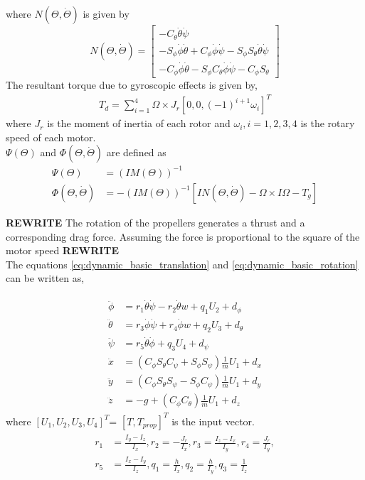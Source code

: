 \documentclass{article}
\begin{document}
where $N(\Theta,\dot{\Theta})$ is given by
\begin{equation*}
N(\Theta,\dot{\Theta})=
\left[\begin{array}{c}
-C_{\theta}\dot{\theta}\dot{\psi} \\
-S_{\phi}\dot{\phi}\dot{\theta}+C_{\phi}\dot{\phi}\dot{\psi} -S_{\phi}S_{\theta}\dot{\theta}\dot{\psi}\\
-C_{\phi}\dot{\phi}\dot{\theta}-S_{\phi}C_{\theta}\dot{\phi}\dot{\psi}-C_{\phi}S_{\theta}
\end{array}\right]
\end{equation*}
The resultant torque due to gyroscopic effects is given by, 
\begin{align}
T_d=\sum_{i=1}^{4}\Omega\times J_r[0,0,(-1)^{i+1}\omega_i]^T
\end{align}
where $J_r$ is the moment of inertia of each rotor and $\omega_i, i=1,2,3,4$ is the rotary speed of each motor.\\
$\Psi(\Theta)$ and $\Phi(\Theta,\dot{\Theta})$ are defined as
\begin{align*}
\Psi(\Theta)&=(IM(\Theta))^{-1}\\
\Phi(\Theta,\dot{\Theta})&=
-(IM(\Theta))^{-1}[IN(\Theta,\dot{\Theta}) -\Omega\times I\Omega-T_g]
\end{align*}

\textbf{REWRITE} The rotation of the propellers generates a thrust and a corresponding drag force. Assuming the force is proportional to the square of the motor speed \textbf{REWRITE}\\


The equations \eqref{eq:dynamic_basic_translation} and \eqref{eq:dynamic_basic_rotation} can be written as,

\begin{align}\label{eq:quad_dyanmics}
\begin{aligned}
\ddot{\phi}&=r_1\dot{\theta}\dot{\psi}-r_2\dot{\theta}w+q_1U_2+d_\phi\\
\ddot{\theta}&=r_3\dot{\phi}\dot{\psi}+r_4\dot{\phi}w+
q_2U_3+d_\theta\\
\ddot{\psi}&=r_5\dot{\theta}\dot{\phi}+q_3U_4+d_\psi\\
\ddot{x}&=(C_{\phi}S_{\theta}C_{\psi}+S_{\phi}S_{\psi})\frac{1}{m}U_1+d_x\\
\ddot{y}&=(C_{\phi}S_{\theta}S_{\psi}-S_{\phi}C_{\psi})\frac{1}{m}U_1+d_y\\
\ddot{z}&=-g+(C_{\phi}C_{\theta})\frac{1}{m}U_1+d_z
\end{aligned}
\end{align}
where $[U_{1},U_{2},U_{3},U_{4}]^{T}$= $[T, T_{prop}]^T$ is the input vector.
\begin{align*}
\begin{aligned}
r_{1}&=\frac{I_{y}-I_{z}}{I_{x}},
r_{2}=-\frac{J_{r}}{I_{x}},
r_{3}=\frac{I_{z}-I_{x}}{I_{y}},
r_{4}=\frac{J_{r}}{I_{y}},\\
r_{5}&=\frac{I_{x}-I_{y}}{I_{z}},
q_{1}=\frac{h}{I_{x}},
q_{2}=\frac{h}{I_{y}},
q_{3}=\frac{1}{I_{z}}
\end{aligned}
\end{align*}\\
\end{document}
